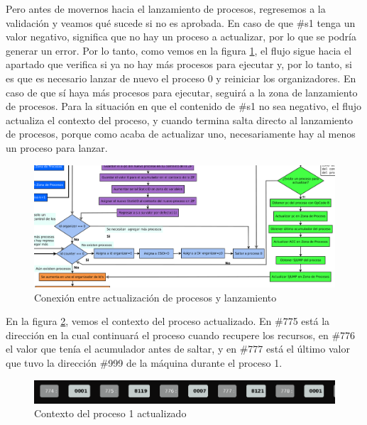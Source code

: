 \documentclass[letterpaper,12pt,oneside]{book}
\begin{document}
		
		Pero antes de movernos hacia el lanzamiento de procesos, regresemos a la validación y veamos qué sucede si no es aprobada.
		En caso de que \#s1 tenga 
		un valor negativo, 
		significa
		que no hay un proceso a actualizar, por lo que se podría generar un error. Por lo tanto, como vemos en la figura 
		\ref{fig:diagConectActLanzamiento},
		el flujo sigue hacia el apartado que verifica si  ya no hay más procesos para ejecutar y, por lo tanto, si es que es necesario lanzar 
		de nuevo el proceso
		0 y reiniciar los organizadores. En caso de que sí haya más procesos para ejecutar, seguirá a la zona de lanzamiento de procesos. Para la 
		situación en que 
		el contenido de \#s1 no sea negativo, 
        el flujo actualiza el contexto del proceso, y cuando termina salta
        directo al lanzamiento de procesos, porque
		como acaba de actualizar uno, necesariamente hay al menos un proceso para lanzar.
		
		\begin{figure}[ht]		
			\centering
			\includegraphics[scale=0.35]{media/CARDIACC/diagConectActLanzamiento.png}
			\caption{ Conexión entre actualización de procesos y lanzamiento}
			\label{fig:diagConectActLanzamiento}
		\end{figure}		
		
		
		En la figura \ref{fig:proceso1ZPactualizadaP1}, vemos el contexto del proceso actualizado. En \#775 está la dirección en la cual continuará
		el proceso cuando recupere los recursos, en \#776 el valor que tenía el acumulador antes de saltar, y en \#777 está el último valor que tuvo la 
		dirección \#999 de la máquina durante el proceso 1.
		
		
		\begin{figure}[h]		
			\centering
			\includegraphics[scale=0.5]{media/CARDIACC/proceso1ZPactualizadaP1.png}
			\caption{ Contexto del proceso 1 actualizado}
			\label{fig:proceso1ZPactualizadaP1}
		\end{figure}		
		
\end{document}

